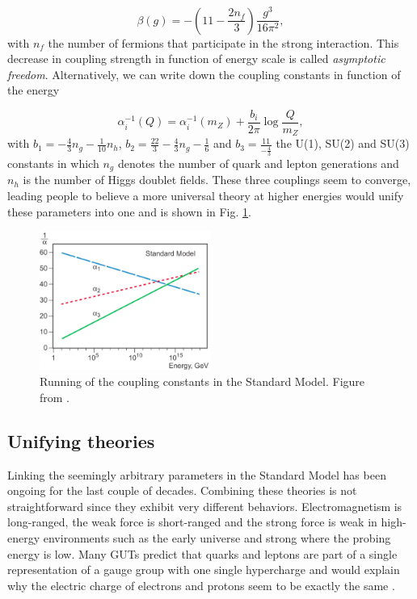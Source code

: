 \begin{equation}
\beta\left(g\right) = -\left(11 - \frac{2n_f}{3}\right)\frac{g^3}{16\pi^2},
\end{equation}
with $n_f$ the number of fermions that participate in the strong interaction. This decrease in coupling strength in function of energy scale is called \textit{asymptotic freedom}. Alternatively, we can write down the coupling constants in function of the energy 

\begin{equation}
\alpha^{-1}_i \left(Q\right) = \alpha^{-1}_{i}\left(m_Z\right) + \frac{b_i}{2\pi}\log\frac{Q}{m_Z},
\end{equation}
with $b_1 = -\frac{4}{3}n_g - \frac{1}{10}n_h$, $b_2 = \frac{22}{3}-\frac{4}{3}n_g-\frac{1}{6}$ and $b_3 = \frac{11}{-\frac{4}{3}}$ the U(1), SU(2) and
SU(3) constants in which $n_g$ denotes the  number of quark and lepton generations and $n_h$ is the number of Higgs doublet fields. These three couplings seem to converge, leading people to believe a more universal theory at higher energies would unify these parameters into one and is shown in Fig. \ref{fig:running}.
\fi

\begin{figure}
\centering
\includegraphics[width = 0.5\textwidth]{chapter1/img/running}
\caption{Running of the coupling constants in the Standard Model. Figure from \cite{nobel2004url}.}
\label{fig:running}
\end{figure}

\subsection{Unifying theories}
\label{sub:unifying}
Linking the seemingly arbitrary parameters in the Standard Model has been ongoing for the last couple of decades. Combining these theories is not straightforward since they exhibit very different behaviors. Electromagnetism is long-ranged, the weak force is short-ranged and the strong force is weak in high-energy environments such as the early universe and strong where the probing energy is low. Many GUTs predict that quarks and leptons are part of a single representation of a gauge group with one single hypercharge and would explain why the electric charge of electrons and protons seem to be exactly the same \cite{He:1989eq}.

